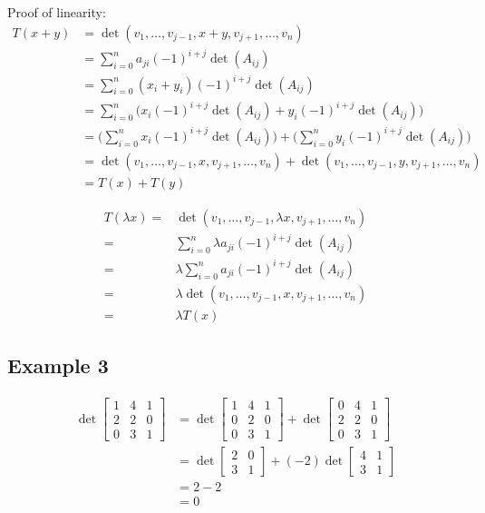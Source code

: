 \documentclass{article}
\theoremstyle{mytheoremstyle}
\theoremstyle{mytheoremstyle}
\theoremstyle{myproblemstyle}
\begin{document}
    Proof of linearity:
    \begin{align*}
        T(x+y)
        &= \det(v_1,\dots,v_{j-1},x+y,v_{j+1},\dots,v_n) \\
        &= \sum_{i=0}^n a_{ji} (-1)^{i+j} \det(A_{ij}) \\
        &= \sum_{i=0}^n (x_i+y_i) (-1)^{i+j} \det(A_{ij}) \\
        &= \sum_{i=0}^n \bigg(x_i(-1)^{i+j} \det(A_{ij})
            +y_i(-1)^{i+j} \det(A_{ij})\bigg) \\
        &= \bigg(\sum_{i=0}^n x_i(-1)^{i+j} \det(A_{ij})\bigg)
            +\bigg(\sum_{i=0}^ny_i(-1)^{i+j} \det(A_{ij})\bigg) \\
        &= \det(v_1,\dots,v_{j-1},x,v_{j+1},\dots,v_n)
            +\det(v_1,\dots,v_{j-1},y,v_{j+1},\dots,v_n) \\
        &= T(x)+T(y)
    \end{align*}

    \begin{align*}
        T(\lambda x) = & \det(v_1,\dots,v_{j-1},\lambda x,v_{j+1},\dots,v_n) \\
        =& \sum_{i=0}^n \lambda a_{ji} (-1)^{i+j} \det(A_{ij}) \\
        =& \lambda \sum_{i=0}^n a_{ji} (-1)^{i+j} \det(A_{ij}) \\
        =& \lambda \det(v_1,\dots,v_{j-1},x,v_{j+1},\dots,v_n) \\
        =& \lambda T(x)
    \end{align*}

    \subsection*{Example 3}
    \begin{align*}
        \det \begin{bmatrix}
            1 & 4 & 1 \\
            2 & 2 & 0 \\
            0 & 3 & 1
        \end{bmatrix} &=
        \det \begin{bmatrix}
            1 & 4 & 1 \\
            0 & 2 & 0 \\
            0 & 3 & 1
        \end{bmatrix} +
        \det \begin{bmatrix}
            0 & 4 & 1 \\
            2 & 2 & 0 \\
            0 & 3 & 1
        \end{bmatrix} \\
        &= \det \begin{bmatrix}
            2 & 0 \\
            3 & 1
        \end{bmatrix} + (-2) \det \begin{bmatrix}
            4 & 1 \\
            3 & 1
        \end{bmatrix} \\
        & = 2-2 \\
        &= 0
    \end{align*}
\end{document}

